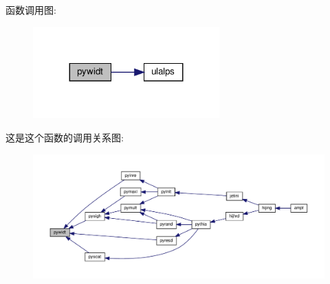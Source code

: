 函数调用图\+:
\nopagebreak
\begin{figure}[H]
\begin{center}
\leavevmode
\includegraphics[width=203pt]{pywidt_8f90_a1e758fa4557208bd02dcedf42459682f_cgraph}
\end{center}
\end{figure}
这是这个函数的调用关系图\+:
\nopagebreak
\begin{figure}[H]
\begin{center}
\leavevmode
\includegraphics[width=350pt]{pywidt_8f90_a1e758fa4557208bd02dcedf42459682f_icgraph}
\end{center}
\end{figure}
